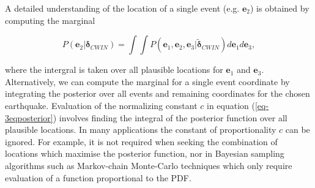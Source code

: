 \documentclass[12pt,double]{article}
\begin{document}
A detailed understanding of the location of a single event (e.g. $\mathbf{e}_2$) is obtained by computing the
marginal
\begin{linenomath*} \begin{equation}
\label{eq:-E2-marginal}
P(\mathbf{e}_2|\mathbf{\delta}_{CWIN}) = \int \int P(\mathbf{e}_1, \mathbf{e}_2,
 \mathbf{e}_3 | \widetilde{\mathbf{\delta}}_{CWIN}) d\mathbf{e}_1
 d\mathbf{e}_3,
\end{equation} \end{linenomath*}
where the intergral is taken over all plausible locations for
$\mathbf{e}_1$ and $\mathbf{e}_3$. Alternatively, we can compute the
marginal for a single event coordinate by integrating the posterior
over all events and remaining coordinates for the chosen earthquake.
Evaluation of the normalizing constant $c$ in equation (\ref{eq-3eqposterior}) involves
finding the integral of the posterior function
over all plausible locations. In many applications the constant
of proportionality $c$ can be ignored. For example, it is not
required when seeking the combination of locations which maximise
 the posterior function, nor in Bayesian sampling algorithms such as Markov-chain Monte-Carlo
techniques which only require evaluation of a function proportional to the PDF.
\end{document}
